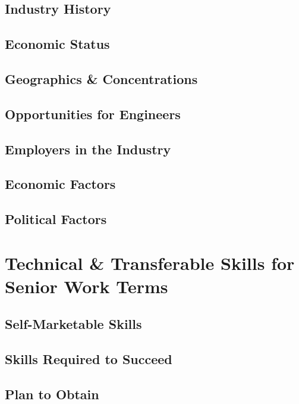 \documentclass[10pt,letterpaper]{article}
\begin{document}
\subsection{Industry History}
\subsection{Economic Status}
\subsection{Geographics \& Concentrations}
\subsection{Opportunities for Engineers}
\subsection{Employers in the Industry}
\subsection{Economic Factors}
\subsection{Political Factors}

\clearpage
\section{Technical \& Transferable Skills for Senior Work Terms}\label{transferable-skills}




\subsection{Self-Marketable Skills}

\subsection{Skills Required to Succeed}

\subsection{Plan to Obtain}
\end{document}
